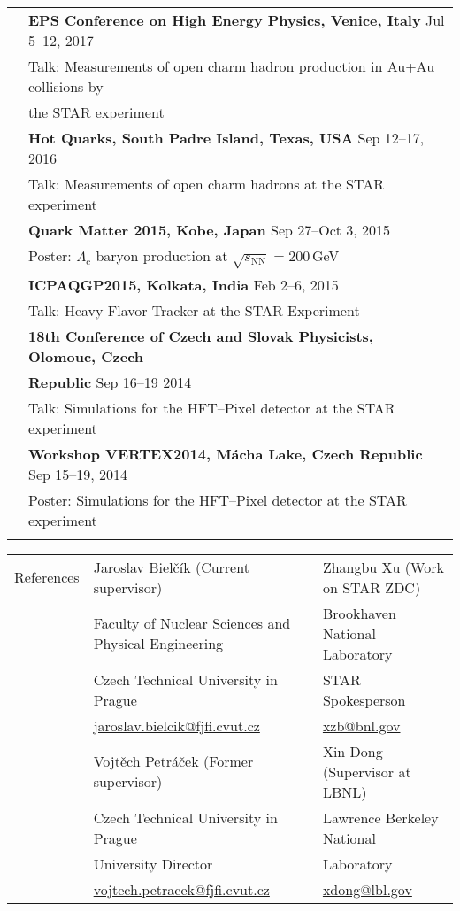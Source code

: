 \documentclass[a4paper,11pt,oneside]{article}
\begin{document}
\begin{tabular}{@{} l l}
     & \textbf{EPS Conference on High Energy Physics, Venice, Italy} Jul 5--12, 2017\\
     & Talk: Measurements of open charm hadron production in Au+Au collisions by  \\
     & the STAR experiment \\[.2cm]
     & \textbf{Hot Quarks, South Padre Island, Texas, USA} Sep 12--17, 2016\\
     & Talk: Measurements of open charm hadrons at the STAR experiment \\[.2cm]
     & \textbf{Quark Matter 2015, Kobe, Japan} Sep 27--Oct 3, 2015\\
     & Poster: $\Lambda_\mathrm{c}$ baryon production at $\sqrt{s_\mathrm{NN}} = 200\,$GeV \\[.2cm]
     & \textbf{ICPAQGP2015, Kolkata, India} Feb 2--6, 2015\\
     & Talk: Heavy Flavor Tracker at the STAR Experiment \\[.2cm]
     & \textbf{18th Conference of Czech and Slovak Physicists, Olomouc, Czech} \\
     & \textbf{Republic} Sep 16--19 2014 \\
     & Talk: Simulations for the HFT--Pixel detector at the STAR experiment\\[.2cm]
     & \textbf{Workshop VERTEX2014, Mácha Lake, Czech Republic} Sep 15--19, 2014\\
     & Poster: Simulations for the HFT--Pixel detector at the STAR experiment \\
     & \\
\end{tabular}

\noindent \begin{tabular}{@{} l l l}
 \Large{References} & Jaroslav Bielčík (Current supervisor)& Zhangbu Xu (Work on STAR ZDC) \\
 & Faculty of Nuclear Sciences and Physical Engineering &  Brookhaven National Laboratory  \\
 & Czech Technical University in Prague &  STAR Spokesperson \\
 & \small{\href{mailto:jaroslav.bielcik@fjfi.cvut.cz}{jaroslav.bielcik@fjfi.cvut.cz}} & \small{\href{mailto:xzb@bnl.gov}{xzb@bnl.gov}} \\[.2cm]
 & Vojtěch Petráček (Former supervisor)  &  Xin Dong (Supervisor at LBNL) \\
 & Czech Technical University in Prague  &  Lawrence Berkeley National \\
 & University Director &  Laboratory \\
 & \small{\href{mailto:vojtech.petracek@fjfi.cvut.cz}{vojtech.petracek@fjfi.cvut.cz}} & \small{\href{mailto:xdong@lbl.gov}{xdong@lbl.gov}} \\
\end{tabular}
\end{document}
